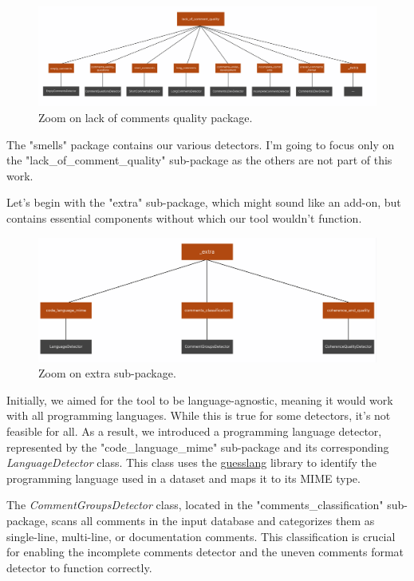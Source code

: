 \begin{figure}[ht]
	\centering\includegraphics[width=465pt]{figs/zoom-cmsquality.PNG}
	\captionsetup{justification=centering}
	\caption{Zoom on lack of comments quality package.}
	\label{fig:zoom-cmsquality}
\end{figure}
	
\noindent The "smells" package contains our various detectors. I'm going to focus only on the "lack\_of\_comment\_quality" sub-package as the others are not part of this work.

\noindent Let’s begin with the "extra" sub-package, which might sound like an add-on, but contains essential components without which our tool wouldn't function.

\begin{figure}[ht]
	\centering\includegraphics[width=400pt]{figs/zoom-extra.PNG}
	\captionsetup{justification=centering}
	\caption{Zoom on extra sub-package.}
	\label{fig:zoom-extra}
\end{figure}

\noindent Initially, we aimed for the tool to be language-agnostic, meaning it would work with all programming languages. While this is true for some detectors, it’s not feasible for all. As a result, we introduced a programming language detector, represented by the "code\_language\_mime" sub-package and its corresponding \textit{LanguageDetector} class. This class uses the \href{https://github.com/jossef/guesslang}{guesslang} library to identify the programming language used in a dataset and maps it to its MIME type.

\noindent The \textit{CommentGroupsDetector} class, located in the "comments\_classification" sub-package, scans all comments in the input database and categorizes them as single-line, multi-line, or documentation comments. This classification is crucial for enabling the incomplete comments detector and the uneven comments format detector to function correctly.

